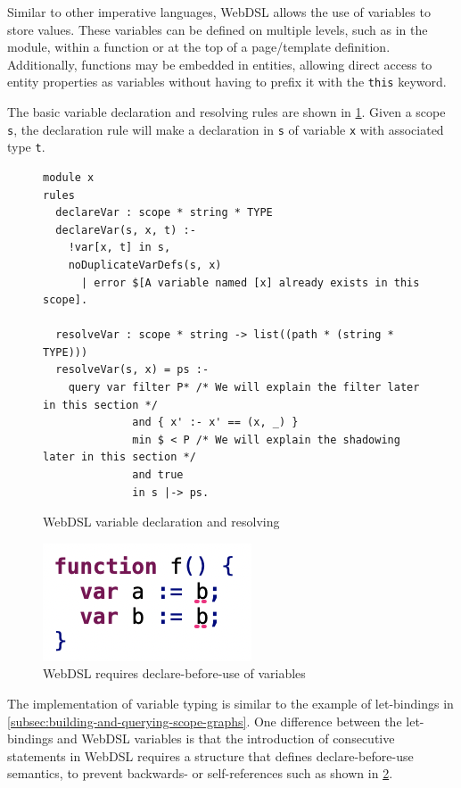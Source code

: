       Similar to other imperative languages, WebDSL allows the use of variables to store values. These variables can be defined on multiple levels, such as in the module, within a function or at the top of a page/template definition. Additionally, functions may be embedded in entities, allowing direct access to entity properties as variables without having to prefix it with the \texttt{this} keyword.

      The basic variable declaration and resolving rules are shown in \cref{fig:webdsl-simple-variable-declaration-and-resolving}. Given a scope \texttt{s}, the declaration rule will make a declaration in \texttt{s} of variable \texttt{x} with associated type \texttt{t}.

      \begin{figure}[H]
        \begin{verbatim}
module x
rules
  declareVar : scope * string * TYPE
  declareVar(s, x, t) :-
    !var[x, t] in s,
    noDuplicateVarDefs(s, x)
      | error $[A variable named [x] already exists in this scope].

  resolveVar : scope * string -> list((path * (string * TYPE)))
  resolveVar(s, x) = ps :-
    query var filter P* /* We will explain the filter later in this section */
              and { x' :- x' == (x, _) }
              min $ < P /* We will explain the shadowing later in this section */
              and true
              in s |-> ps.
        \end{verbatim}
        \caption{\label{fig:webdsl-simple-variable-declaration-and-resolving}WebDSL variable declaration and resolving}
      \end{figure}

      \begin{figure}
        \capstart
        \includegraphics{../img/webdsl-simple-variable-declare-before-use}
        \caption{\label{fig:webdsl-simple-variable-declare-before-use}WebDSL requires declare-before-use of variables}
      \end{figure}

      The implementation of variable typing is similar to the example of let-bindings in \cref{subsec:building-and-querying-scope-graphs}. One difference between the let-bindings and WebDSL variables is that the introduction of consecutive statements in WebDSL requires a structure that defines declare-before-use semantics, to prevent backwards- or self-references such as shown in \cref{fig:webdsl-simple-variable-declare-before-use}.

